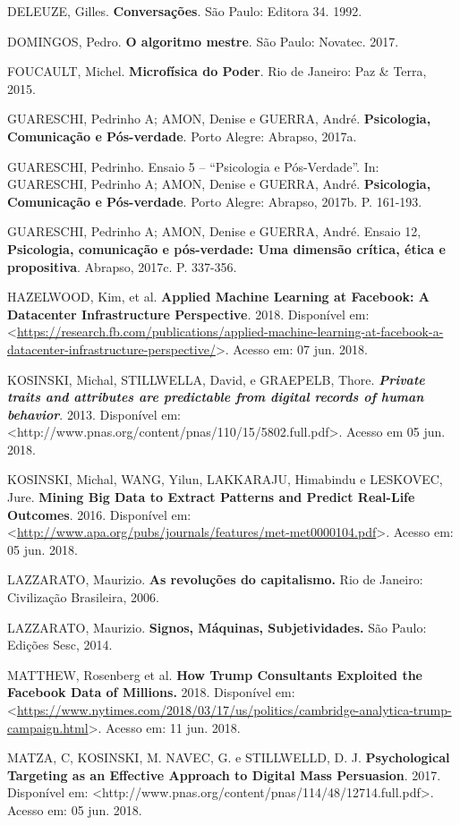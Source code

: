 DELEUZE, Gilles. \textbf{Conversações}. São Paulo: Editora 34. 1992.

DOMINGOS, Pedro. \textbf{O algoritmo mestre}. São Paulo: Novatec. 2017.

FOUCAULT, Michel. \textbf{Microfísica do Poder}. Rio de Janeiro: Paz \&
Terra, 2015.

GUARESCHI, Pedrinho A; AMON, Denise e GUERRA, André. \textbf{Psicologia,
Comunicação e Pós-verdade}. Porto Alegre: Abrapso, 2017a.

GUARESCHI, Pedrinho. Ensaio 5 -- ``Psicologia e Pós-Verdade''. In:
GUARESCHI, Pedrinho A; AMON, Denise e GUERRA, André. \textbf{Psicologia,
Comunicação e Pós-verdade}. Porto Alegre: Abrapso, 2017b. P. 161-193.

GUARESCHI, Pedrinho A; AMON, Denise e GUERRA, André. Ensaio 12,
\textbf{Psicologia, comunicação e pós-verdade: Uma dimensão crítica,
ética e propositiva}. Abrapso, 2017c. P. 337-356.

HAZELWOOD, Kim, et al. \textbf{Applied Machine Learning at Facebook: A
Datacenter Infrastructure Perspective}\emph{.} 2018. Disponível em:
\textless{}\url{https://research.fb.com/publications/applied-machine-learning-at-facebook-a-datacenter-infrastructure-perspective/}\textgreater{}.
Acesso em: 07 jun. 2018.

KOSINSKI, Michal, STILLWELLA, David, e GRAEPELB, Thore.
\emph{\textbf{Private traits and attributes are predictable from digital
records of human behavior}}. 2013. Disponível em:
\textless{}http://www.pnas.org/content/pnas/110/15/5802.full.pdf\textgreater{}.
Acesso em 05 jun. 2018.

KOSINSKI, Michal, WANG, Yilun, LAKKARAJU, Himabindu e LESKOVEC, Jure.
\textbf{Mining Big Data to Extract Patterns and Predict Real-Life
Outcomes}. 2016. Disponível em:
\textless{}\url{http://www.apa.org/pubs/journals/features/met-met0000104.pdf}\textgreater{}.
Acesso em: 05 jun. 2018.

LAZZARATO, Maurizio. \textbf{As revoluções do capitalismo.} Rio de
Janeiro: Civilização Brasileira, 2006.

LAZZARATO, Maurizio. \textbf{Signos, Máquinas, Subjetividades.} São
Paulo: Edições Sesc, 2014.

MATTHEW, Rosenberg et al. \textbf{How Trump Consultants Exploited the
Facebook Data of Millions.} 2018. Disponível em:
\textless{}\url{https://www.nytimes.com/2018/03/17/us/politics/cambridge-analytica-trump-campaign.html}\textgreater{}.
Acesso em: 11 jun. 2018.

MATZA, C, KOSINSKI, M. NAVEC, G. e STILLWELLD, D. J.
\textbf{Psychological Targeting as an Effective Approach to Digital Mass
Persuasion}. 2017. Disponível em:
\textless{}http://www.pnas.org/content/pnas/114/48/12714.full.pdf\textgreater{}.
Acesso em: 05 jun. 2018.

